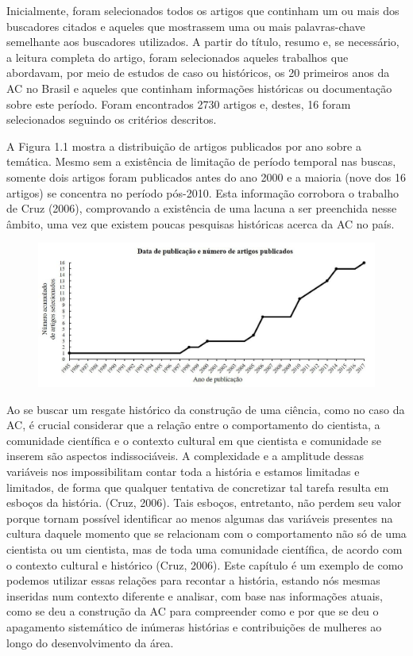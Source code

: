 Inicialmente, foram selecionados todos os artigos que continham um ou mais dos buscadores citados e aqueles que mostrassem uma ou mais palavras-chave semelhante aos buscadores utilizados. A partir do título, resumo e, se necessário, a leitura completa do artigo, foram selecionados aqueles trabalhos que abordavam, por meio de estudos de caso ou históricos, os 20 primeiros anos da AC no Brasil e aqueles que continham informações históricas ou documentação sobre este período. Foram encontrados 2730 artigos e, destes, 16 foram selecionados seguindo os critérios descritos.

A Figura 1.1 mostra a distribuição de artigos publicados por ano sobre a temática. Mesmo sem a existência de limitação de período temporal nas buscas, somente dois artigos foram publicados antes do ano 2000 e a maioria (nove dos 16 artigos) se concentra no período pós-2010. Esta informação corrobora o trabalho de Cruz (2006), comprovando a existência de uma lacuna a ser preenchida nesse âmbito, uma vez que existem poucas pesquisas históricas acerca da AC no país.

\begin{figure}[h]
\includegraphics[width=1\textwidth]{1/figura1}
\end{figure}

Ao se buscar um resgate histórico da construção de uma ciência, como no caso da AC, é crucial considerar que a relação entre o comportamento do cientista, a comunidade científica e o contexto cultural em que cientista e comunidade se inserem são aspectos indissociáveis. A complexidade e a amplitude dessas variáveis nos impossibilitam contar toda a história e estamos limitadas e limitados, de forma que qualquer tentativa de concretizar tal tarefa resulta em esboços da história. (Cruz, 2006). Tais esboços, entretanto, não perdem seu valor porque tornam possível identificar ao menos algumas das variáveis presentes na cultura daquele momento que se relacionam com o comportamento não só de uma cientista ou um cientista, mas de toda uma comunidade científica, de acordo com o contexto cultural e histórico (Cruz, 2006). Este capítulo é um exemplo de como podemos utilizar essas relações para recontar a história, estando nós mesmas inseridas num contexto diferente e analisar, com base nas informações atuais, como se deu a construção da AC para compreender como e por que se deu o apagamento sistemático de inúmeras histórias e contribuições de mulheres ao longo do desenvolvimento da área.

